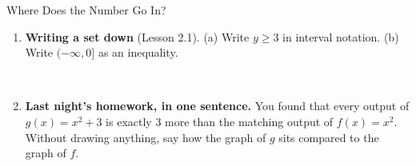 \documentclass[10pt]{article}
\begin{document}
\begin{notesbox}{Where Does the Number Go In?}
\begin{enumerate}[leftmargin=1.6em, itemsep=4pt, topsep=4pt]
\\

\item \textbf{Writing a set down} (Lesson 2.1). \quad (a) Write $y \ge 3$ in interval notation.
\quad (b) Write $(-\infty, 0]$ as an inequality.

\ansline{(a) $[3,\infty)$ \qquad (b) $x \le 0$}\\

\item \textbf{Last night's homework, in one sentence.} You found that every output of
$g(x)=x^2+3$ is exactly $3$ more than the matching output of $f(x)=x^2$. Without drawing
anything, say how the graph of $g$ sits compared to the graph of $f$.

\\

\end{enumerate}
\end{notesbox}
\end{document}
